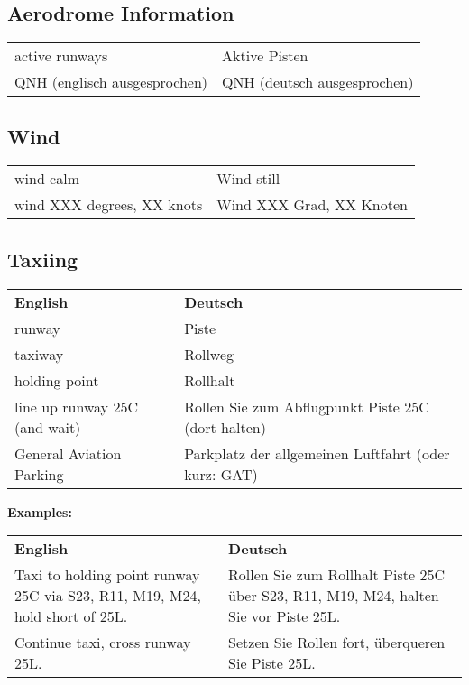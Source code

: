 \subsection{Aerodrome Information}
\begin{table}[H]
	\begin{tabular}{ll}
		active runways               & Aktive Pisten               \\
		QNH (englisch ausgesprochen) & QNH (deutsch ausgesprochen)                        
	\end{tabular}
\end{table}

\subsection{Wind}
\begin{table}[H]
	\begin{tabularx}{\textwidth}{XX}
		wind calm                  & Wind still               \\
		wind XXX degrees, XX knots & Wind XXX Grad, XX Knoten
	\end{tabularx}
\end{table}

\subsection{Taxiing}
\begin{table}[H]
	\begin{tabularx}{\textwidth}{XX}
		\textbf{English} 				& \textbf{Deutsch}     								   \\
		runway                        	& Piste                                                \\
		taxiway                       	& Rollweg                                              \\
		holding point                 	& Rollhalt                                             \\
		line up runway 25C (and wait) 	& Rollen Sie zum Abflugpunkt Piste 25C (dort halten)   \\
		General Aviation Parking     	& Parkplatz der allgemeinen Luftfahrt (oder kurz: GAT)
	\end{tabularx}
\end{table}
\textbf{Examples:}
\begin{table}[H]
	\begin{tabularx}{\textwidth}{XX}
		\textbf{English} 															& \textbf{Deutsch}      															   \\
		Taxi to holding point runway 25C via S23, R11, M19, M24, hold short of 25L. & Rollen Sie zum Rollhalt Piste 25C über S23, R11, M19, M24, halten Sie vor Piste 25L. \\
		Continue taxi, cross runway 25L.                                            & Setzen Sie Rollen fort, überqueren Sie Piste 25L.
	\end{tabularx}
\end{table}

